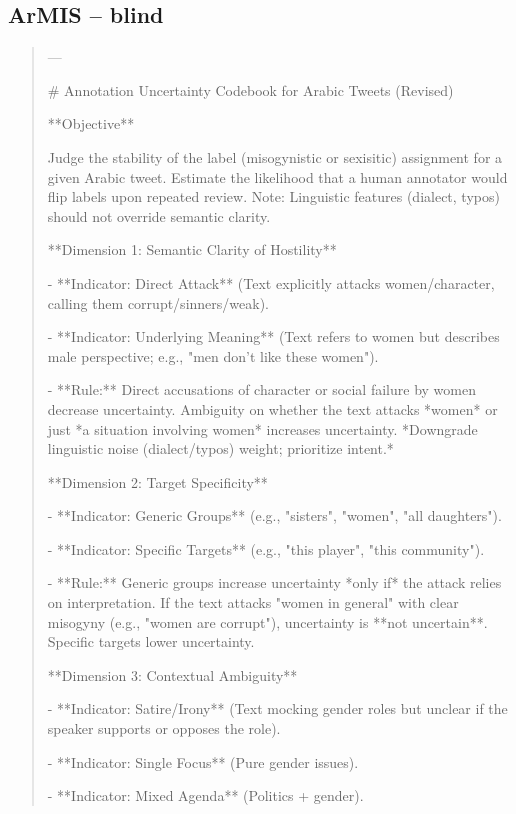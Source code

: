 \subsection*{ArMIS -- blind}
\begin{quote}\small
---

# Annotation Uncertainty Codebook for Arabic Tweets (Revised)



**Objective**

Judge the stability of the label (misogynistic or sexisitic) assignment for a given Arabic tweet. Estimate the likelihood that a human annotator would flip labels upon repeated review. Note: Linguistic features (dialect, typos) should not override semantic clarity.



**Dimension 1: Semantic Clarity of Hostility**

- **Indicator: Direct Attack** (Text explicitly attacks women/character, calling them corrupt/sinners/weak).

- **Indicator: Underlying Meaning** (Text refers to women but describes male perspective; e.g., "men don't like these women").

- **Rule:** Direct accusations of character or social failure by women decrease uncertainty. Ambiguity on whether the text attacks *women* or just *a situation involving women* increases uncertainty. *Downgrade linguistic noise (dialect/typos) weight; prioritize intent.*



**Dimension 2: Target Specificity**

- **Indicator: Generic Groups** (e.g., "sisters", "women", "all daughters").

- **Indicator: Specific Targets** (e.g., "this player", "this community").

- **Rule:** Generic groups increase uncertainty *only if* the attack relies on interpretation. If the text attacks "women in general" with clear misogyny (e.g., "women are corrupt"), uncertainty is **not uncertain**. Specific targets lower uncertainty.



**Dimension 3: Contextual Ambiguity**

- **Indicator: Satire/Irony** (Text mocking gender roles but unclear if the speaker supports or opposes the role).

- **Indicator: Single Focus** (Pure gender issues).

- **Indicator: Mixed Agenda** (Politics + gender).


\end{quote}
